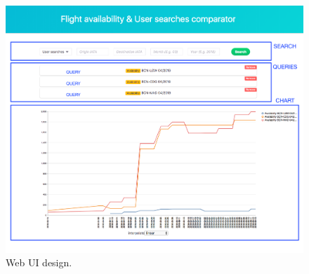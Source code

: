 \begin{figure}[H]
\centering
\includegraphics[scale=0.29]{resources/website-design.png}
\caption{Web UI design.}
\end{figure}


